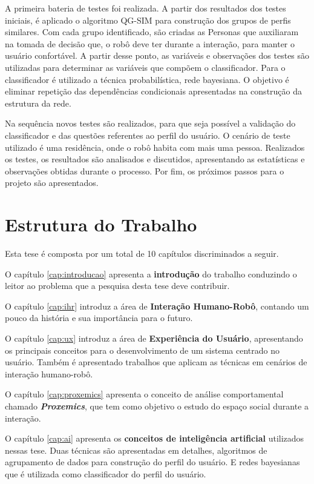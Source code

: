 A primeira bateria de testes foi realizada. A partir dos resultados dos testes iniciais, é aplicado o algoritmo QG-SIM para construção dos grupos de perfis similares. Com cada grupo identificado, são criadas as Personas que auxiliaram na tomada de decisão que, o robô deve ter durante a interação, para manter o usuário confortável. A partir desse ponto, as variáveis e observações dos testes são utilizadas para determinar as variáveis que compõem o classificador. Para o classificador é utilizado a técnica probabilística, rede bayesiana. O objetivo é eliminar repetição das dependências condicionais apresentadas na construção da estrutura da rede.

Na sequência novos testes são realizados, para que seja possível a validação do classificador e das questões referentes ao perfil do usuário. O cenário de teste utilizado é uma residência, onde o robô habita com mais uma pessoa. Realizados os testes, os resultados são analisados e discutidos, apresentando as estatísticas e observações obtidas durante o processo. Por fim, os próximos passos para o projeto são apresentados.

\section{Estrutura do Trabalho}
Esta tese é composta por um total de 10 capítulos discriminados a seguir.

O capítulo \ref{cap:introducao} apresenta a \textbf{introdução} do trabalho conduzindo o leitor ao problema que a pesquisa desta tese deve contribuir.

O capítulo \ref{cap:ihr} introduz a área de \textbf{Interação Humano-Robô}, contando um pouco da história e sua importância para o futuro.

O capítulo \ref{cap:ux} introduz a área de \textbf{Experiência do Usuário}, apresentando os principais conceitos para o desenvolvimento de um sistema centrado no usuário. Também é apresentado trabalhos que aplicam as técnicas em cenários de interação humano-robô.

O capítulo \ref{cap:proxemics} apresenta o conceito de análise comportamental chamado \emph{\textbf{Proxemics}}, que tem como objetivo o estudo do espaço social durante a interação.

O capítulo \ref{cap:ai} apresenta os \textbf{conceitos de inteligência artificial} utilizados nessas tese. Duas técnicas são apresentadas em detalhes, algoritmos de agrupamento de dados para construção do perfil do usuário. E redes bayesianas que é utilizada como classificador do perfil do usuário.

